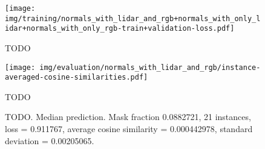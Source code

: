 \begin{figure}[H]
  \texttt{[image: img/training/normals\_with\_lidar\_and\_rgb+normals\_with\_only\_lidar+normals\_with\_only\_rgb-train+validation-loss.pdf]}
  \caption{TODO}
\end{figure}

\begin{figure}[H]
  \texttt{[image: img/evaluation/normals\_with\_lidar\_and\_rgb/instance-averaged-cosine-similarities.pdf]}
  \caption{TODO}
\end{figure}

\begin{figure}[H]
  \caption{%
    TODO.
    Median prediction.
    Mask fraction \num{0.0882721}, 21 instances, loss = \num{0.911767}, average cosine similarity = \num{0.000442978}, standard deviation = \num{0.00205065}.
  }
\end{figure}
